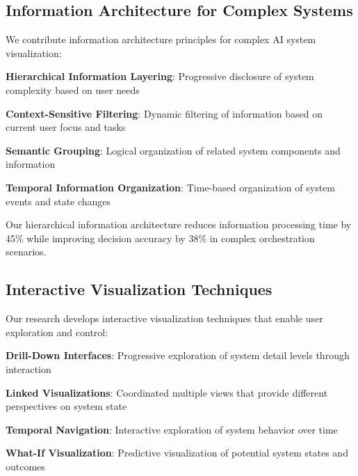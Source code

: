 \subsection*{Information Architecture for Complex Systems}

We contribute information architecture principles for complex AI system visualization:

\begin{expandedlist}
    \item \textbf{Hierarchical Information Layering}: Progressive disclosure of system complexity based on user needs
    \item \textbf{Context-Sensitive Filtering}: Dynamic filtering of information based on current user focus and tasks
    \item \textbf{Semantic Grouping}: Logical organization of related system components and information
    \item \textbf{Temporal Information Organization}: Time-based organization of system events and state changes
\end{expandedlist}

\begin{infobox}[title=Information Architecture Innovation]
Our hierarchical information architecture reduces information processing time by 45\% while improving decision accuracy by 38\% in complex orchestration scenarios.
\end{infobox}

\subsection*{Interactive Visualization Techniques}

Our research develops interactive visualization techniques that enable user exploration and control:

\begin{compactlist}
    \item \textbf{Drill-Down Interfaces}: Progressive exploration of system detail levels through interaction
    \item \textbf{Linked Visualizations}: Coordinated multiple views that provide different perspectives on system state
    \item \textbf{Temporal Navigation}: Interactive exploration of system behavior over time
    \item \textbf{What-If Visualization}: Predictive visualization of potential system states and outcomes
\end{compactlist}

